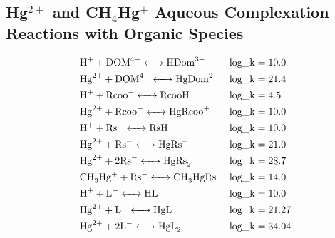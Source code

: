 \documentclass[12pt, a4paper]{article}
\begin{document}
\subsection{Hg$^{2+}$ and CH$_4$Hg$^{+}$ Aqueous Complexation Reactions with Organic Species}

\begin{align}
& \ce{H+ + DOM^4- <-> HDom^3-} && \mathrm{log\_k} = 10.0 \\
& \ce{Hg^2+ + DOM^4- <-> HgDom^2-} && \mathrm{log\_k} = 21.4 \\
& \ce{H+ + Rcoo^- <-> RcooH} && \mathrm{log\_k} = 4.5 \\
& \ce{Hg^2+ + Rcoo^- <-> HgRcoo^+} && \mathrm{log\_k} = 10.0 \\
& \ce{H+ + Rs^- <-> RsH} && \mathrm{log\_k} = 10.0 \\
& \ce{Hg^2+ + Rs^- <-> HgRs^+} && \mathrm{log\_k} = 21.0 \\
& \ce{Hg^2+ + 2 Rs^- <-> HgRs_2} && \mathrm{log\_k} = 28.7 \\
& \ce{CH_3Hg+ + Rs^- <-> CH_3HgRs} && \mathrm{log\_k} = 14.0 \\
& \ce{H+ + L^- <-> HL} && \mathrm{log\_k} = 10.0 \\
& \ce{Hg^2+ + L^- <-> HgL^+} && \mathrm{log\_k} = 21.27 \\
& \ce{Hg^2+ + 2 L^- <-> HgL_2} && \mathrm{log\_k} = 34.04 \\

\end{align}
\end{document}
